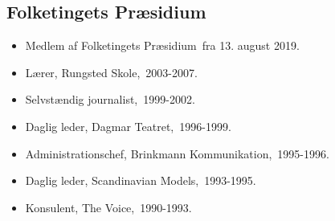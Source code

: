\documentclass[11pt, a4paper]{awesome-cv}
\begin{document}
\begin{cvletter}
\subsection*{Folketingets Præsidium}
\begin{itemize}
\item Medlem af Folketingets Præsidium fra 13. august 2019.
\end{itemize}
\begin{itemize}
\item Lærer, Rungsted Skole, 2003-2007.
\item Selvstændig journalist, 1999-2002.
\item Daglig leder, Dagmar Teatret, 1996-1999.
\item Administrationschef, Brinkmann Kommunikation, 1995-1996.
\item Daglig leder, Scandinavian Models, 1993-1995.
\item Konsulent, The Voice, 1990-1993.
\end{itemize}
\end{cvletter}
\end{document}
